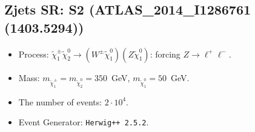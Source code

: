 \documentclass[12pt]{article}
\begin{document}
    
\subsection{Zjets SR: S2 (ATLAS\_2014\_I1286761 (1403.5294))} 


        \begin{itemize}
        \item  Process: $\tilde \chi_1^\pm \tilde \chi_2^0 \to (W^\pm \tilde \chi_1^0) (Z \tilde \chi_1^0)$: forcing $Z \to \ell^+ \ell^-$.
        \item  Mass: $m_{\tilde \chi_1^\pm} = m_{\tilde \chi_2^0} = 350$~GeV, $m_{\tilde \chi_1^0} = 50$~GeV.
        \item  The number of events: $2 \cdot 10^4$.
        \item  Event Generator: {\tt Herwig++ 2.5.2}.    
        \end{itemize}    
    
\end{document}
